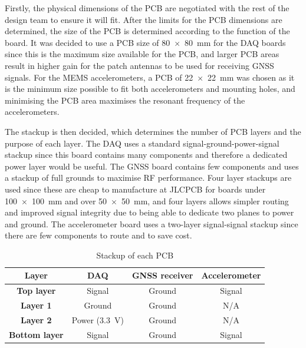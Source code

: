 \documentclass[a4paper,11pt]{article}
\begin{document}
Firstly, the physical dimensions of the PCB are negotiated with the rest of the design team to ensure it will fit. After the limits for the PCB dimensions are determined, the size of the PCB is determined according to the function of the board. It was decided to use a PCB size of \SI{80 x 80}{\milli\metre} for the DAQ boards since this is the maximum size available for the PCB, and larger PCB areas result in higher gain for the patch antennas to be used for receiving GNSS signals. For the MEMS accelerometers, a PCB of \SI{22 x 22}{\milli\metre} was chosen as it is the minimum size possible to fit both accelerometers and mounting holes, and minimising the PCB area maximises the resonant frequency of the accelerometers.

The stackup is then decided, which determines the number of PCB layers and the purpose of each layer. The DAQ uses a standard signal-ground-power-signal stackup since this board contains many components and therefore a dedicated power layer would be useful. The GNSS board contains few components and uses a stackup of full grounds to maximise RF performance. Four layer stackups are used since these are cheap to manufacture at JLCPCB for boards under \SI{100x100}{\milli\meter} and over \SI{50x50}{\milli\metre}, and four layers allows simpler routing and improved signal integrity due to being able to dedicate two planes to power and ground. The accelerometer board uses a two-layer signal-signal stackup since there are few components to route and to save cost.

\begin{table}[H]
  \centering
  \begin{tabular}{|c|c|c|c|}
    \hline
    \textbf{Layer}        & \textbf{DAQ}            & \textbf{GNSS receiver} & \textbf{Accelerometer} \\
    \hline
    \textbf{Top layer}    & Signal                  & Ground                 & Signal                 \\
    \textbf{Layer 1}      & Ground                  & Ground                 & N/A                    \\
    \textbf{Layer 2}      & Power (\SI{3.3}{\volt}) & Ground                 & N/A                    \\
    \textbf{Bottom layer} & Signal                  & Ground                 & Signal                 \\
    \hline
  \end{tabular}
  \caption{Stackup of each PCB}
  \label{tabl:stackups}
\end{table}
\end{document}
